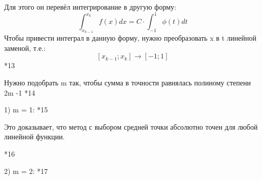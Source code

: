 \documentclass[12pt]{article}
\begin{document}
\begin{itemize}
    Для этого он перевёл интегрирование в другую форму:
    \[
      \int_{x_{k-1}}^{x_k} f(x)dx = C \cdot \int_{-1}^{1} \phi(t)dt
    \] 
    Чтобы привести интеграл в данную форму, нужно преобразовать x в t линейной
    заменой, т.е.:
    \[
      [x_{k-1}; x_k] \longrightarrow [-1; 1]
    \] 
    *13
    
    Нужно подобрать m так, чтобы сумма в точности равнялась полиному степени 2m
    -1
    *14

    1) m = 1: *15

    Это доказывает, что метод с выбором средней точки абсолютно точен для
    любой линейной функции.

    *16

    2) m = 2: *17

\end{itemize}

\end{document}
